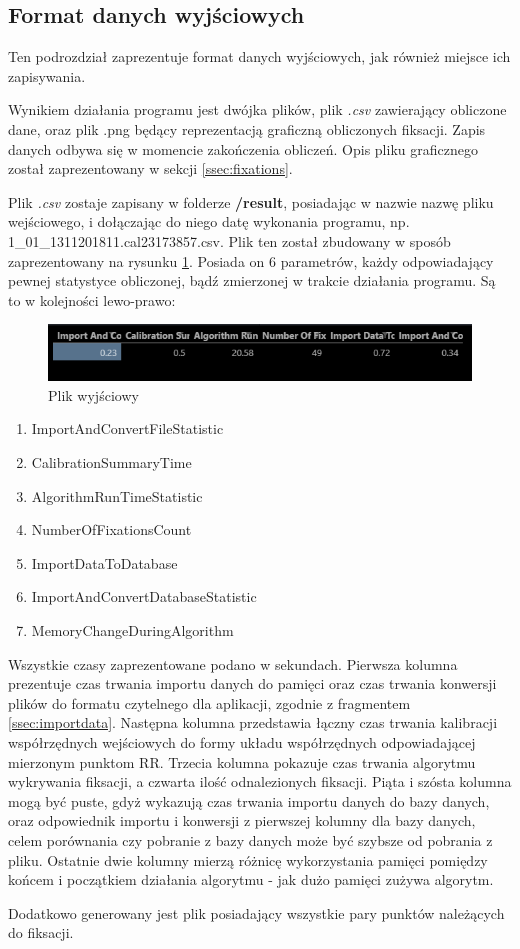 \subsection{Format danych wyjściowych}
Ten podrozdział zaprezentuje format danych wyjściowych, jak również miejsce ich zapisywania.\par
Wynikiem działania programu jest dwójka plików, plik \emph{.csv} zawierający obliczone dane, oraz plik .png będący reprezentacją graficzną obliczonych fiksacji. Zapis danych odbywa się w momencie zakończenia obliczeń. Opis pliku graficznego został zaprezentowany w sekcji \ref{ssec:fixations}.\par
Plik \emph{.csv} zostaje zapisany w folderze \textbf{/result}, posiadając w nazwie nazwę pliku wejściowego, i dołączając do niego datę wykonania programu, np. 1\_01\_1311201811.cal23\-173857.csv.
Plik ten został zbudowany w sposób zaprezentowany na rysunku \ref{fig:exportfile}. Posiada on 6 parametrów, każdy odpowiadający pewnej statystyce obliczonej, bądź zmierzonej w trakcie działania programu. Są to w kolejności lewo-prawo:
\begin{figure}[H]
        \centering
        \captionsetup{justification=centering,margin=2cm}
        \includegraphics[width=0.8\linewidth]{resources/exportfile.png}
        \caption{Plik wyjściowy}
        \label{fig:exportfile}
\end{figure}
\begin{enumerate}
        \itemsep1em 
        \item ImportAndConvertFileStatistic
        \item CalibrationSummaryTime
        \item AlgorithmRunTimeStatistic
        \item NumberOfFixationsCount
        \item ImportDataToDatabase
        \item ImportAndConvertDatabaseStatistic
        \item MemoryChangeDuringAlgorithm
\end{enumerate}
Wszystkie czasy zaprezentowane podano w sekundach. Pierwsza kolumna prezentuje czas trwania importu danych do pamięci oraz czas trwania konwersji plików do formatu czytelnego dla aplikacji, zgodnie z fragmentem \ref{ssec:importdata}. Następna kolumna przedstawia łączny czas trwania kalibracji współrzędnych wejściowych do formy układu współrzędnych odpowiadającej mierzonym punktom RR. Trzecia kolumna pokazuje czas trwania algorytmu wykrywania fiksacji, a czwarta ilość odnalezionych fiksacji. Piąta i szósta kolumna mogą być puste, gdyż wykazują czas trwania importu danych do bazy danych, oraz odpowiednik importu i konwersji z pierwszej kolumny dla bazy danych, celem porównania czy pobranie z bazy danych może być szybsze od pobrania z pliku. Ostatnie dwie kolumny mierzą różnicę wykorzystania pamięci pomiędzy końcem i początkiem działania algorytmu - jak dużo pamięci zużywa algorytm.\par
Dodatkowo generowany jest plik posiadający wszystkie pary punktów należących do fiksacji.

